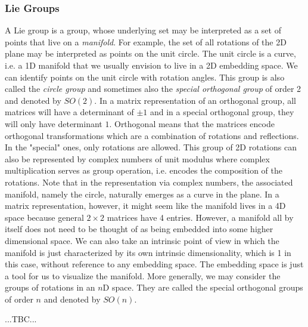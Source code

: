 \subsubsection{Lie Groups}
A Lie group is a group, whose underlying set may be interpreted as a set of points that live on a \emph{manifold}. For example, the set of all rotations of the 2D plane may be interpreted as points on the unit circle. The unit circle is a curve, i.e. a 1D manifold that we usually envision to live in a 2D embedding space. We can identify points on the unit circle with rotation angles. This group is also called the \emph{circle group} and sometimes also the \emph{special orthogonal group} of order 2 and denoted by $SO(2)$. In a matrix representation of an orthogonal group, all matrices will have a determinant of $\pm 1$ and in a special orthogonal group, they will only have determinant $1$. Orthogonal means that the matrices encode orthogonal transformations which are a combination of rotations and reflections. In the "special" ones, only rotations are allowed. This group of 2D rotations can also be represented by complex numbers of unit modulus where complex multiplication serves as group operation, i.e. encodes the composition of the rotations. Note that in the representation via complex numbers, the associated manifold, namely the circle, naturally emerges as a curve in the plane. In a matrix representation, however, it might seem like the manifold lives in a 4D space because general $2 \times 2$ matrices have 4 entries. However, a manifold all by itself does not need to be thought of as being embedded into some higher dimensional space. We can also take an intrinsic point of view in which the manifold is just characterized by its own intrinsic dimensionality, which is 1 in this case, without reference to any embedding space. The embedding space is just a tool for us to visualize the manifold. More generally, we may consider the groups of rotations in an $n$D space. They are called the special orthogonal groups of order $n$ and denoted by $SO(n)$. 



...TBC...


